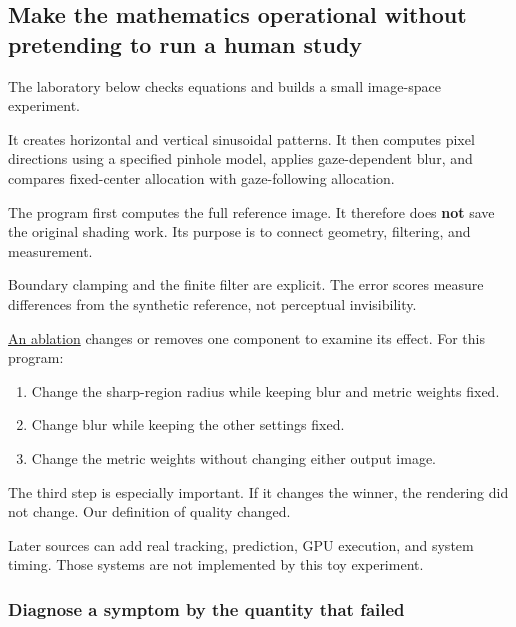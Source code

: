 \subsection{Make the mathematics operational without pretending to run a human study}\label{04-visual-computing-ii-ch043-make-the-mathematics-operational-without-pretending-to-run-a-human-study}

\hypertarget{04-visual-computing-ii-ch043-make-the-mathematics-operational-without-pretending-to-run-a-human-study}{}

The laboratory below checks equations and builds a small image-space experiment.

It creates horizontal and vertical sinusoidal patterns. It then computes pixel directions using a specified pinhole model, applies gaze-dependent blur, and compares fixed-center allocation with gaze-following allocation.

The program first computes the full reference image. It therefore does \textbf{not} save the original shading work. Its purpose is to connect geometry, filtering, and measurement.

Boundary clamping and the finite filter are explicit. The error scores measure differences from the synthetic reference, not perceptual invisibility.

\hyperref[appendix-65788587ef78]{An ablation} changes or removes one component to examine its effect. For this program:

\begin{enumerate}
\def\labelenumi{\arabic{enumi}.}
\tightlist
\item
  Change the sharp-region radius while keeping blur and metric weights fixed.
\item
  Change blur while keeping the other settings fixed.
\item
  Change the metric weights without changing either output image.
\end{enumerate}

The third step is especially important. If it changes the winner, the rendering did not change. Our definition of quality changed.

Later sources can add real tracking, prediction, GPU execution, and system timing. Those systems are not implemented by this toy experiment.

\subsubsection{Diagnose a symptom by the quantity that failed}\label{04-visual-computing-ii-ch043-diagnose-a-symptom-by-the-quantity-that-failed}

